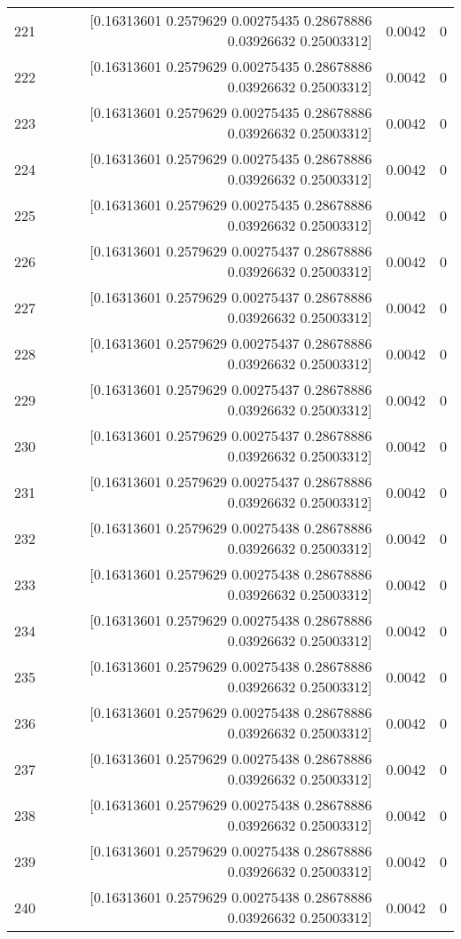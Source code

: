 \begin{longtable}{lrrr}
221 & [0.16313601 0.2579629  0.00275435 0.28678886 0.03926632 0.25003312] & 0.0042 & 0 \\
222 & [0.16313601 0.2579629  0.00275435 0.28678886 0.03926632 0.25003312] & 0.0042 & 0 \\
223 & [0.16313601 0.2579629  0.00275435 0.28678886 0.03926632 0.25003312] & 0.0042 & 0 \\
224 & [0.16313601 0.2579629  0.00275435 0.28678886 0.03926632 0.25003312] & 0.0042 & 0 \\
225 & [0.16313601 0.2579629  0.00275435 0.28678886 0.03926632 0.25003312] & 0.0042 & 0 \\
226 & [0.16313601 0.2579629  0.00275437 0.28678886 0.03926632 0.25003312] & 0.0042 & 0 \\
227 & [0.16313601 0.2579629  0.00275437 0.28678886 0.03926632 0.25003312] & 0.0042 & 0 \\
228 & [0.16313601 0.2579629  0.00275437 0.28678886 0.03926632 0.25003312] & 0.0042 & 0 \\
229 & [0.16313601 0.2579629  0.00275437 0.28678886 0.03926632 0.25003312] & 0.0042 & 0 \\
230 & [0.16313601 0.2579629  0.00275437 0.28678886 0.03926632 0.25003312] & 0.0042 & 0 \\
231 & [0.16313601 0.2579629  0.00275437 0.28678886 0.03926632 0.25003312] & 0.0042 & 0 \\
232 & [0.16313601 0.2579629  0.00275438 0.28678886 0.03926632 0.25003312] & 0.0042 & 0 \\
233 & [0.16313601 0.2579629  0.00275438 0.28678886 0.03926632 0.25003312] & 0.0042 & 0 \\
234 & [0.16313601 0.2579629  0.00275438 0.28678886 0.03926632 0.25003312] & 0.0042 & 0 \\
235 & [0.16313601 0.2579629  0.00275438 0.28678886 0.03926632 0.25003312] & 0.0042 & 0 \\
236 & [0.16313601 0.2579629  0.00275438 0.28678886 0.03926632 0.25003312] & 0.0042 & 0 \\
237 & [0.16313601 0.2579629  0.00275438 0.28678886 0.03926632 0.25003312] & 0.0042 & 0 \\
238 & [0.16313601 0.2579629  0.00275438 0.28678886 0.03926632 0.25003312] & 0.0042 & 0 \\
239 & [0.16313601 0.2579629  0.00275438 0.28678886 0.03926632 0.25003312] & 0.0042 & 0 \\
240 & [0.16313601 0.2579629  0.00275438 0.28678886 0.03926632 0.25003312] & 0.0042 & 0 \\

\end{longtable}
